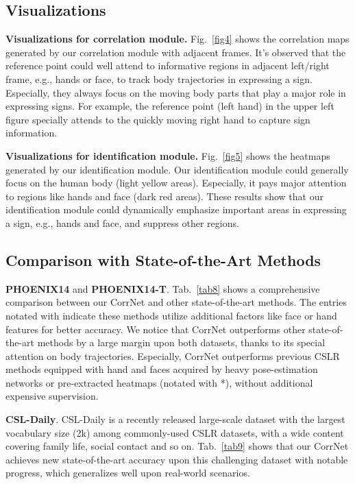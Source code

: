 \documentclass[10pt,twocolumn,letterpaper]{article}
\begin{document}
\subsection{Visualizations}
\textbf{Visualizations for correlation module.} Fig.~\ref{fig4} shows the correlation maps generated by our correlation module with adjacent frames. It's observed that the reference point could well attend to informative regions in adjacent left/right frame, e.g., hands or face, to track body trajectories in expressing a sign. Especially, they always focus on the moving body parts that play a major role in expressing signs. For example, the reference point (left hand) in the upper left figure specially attends to the quickly moving right hand to capture sign information.

\textbf{Visualizations for identification module.} Fig.~\ref{fig5} shows the heatmaps generated by our identification module. Our identification module could generally focus on the human body (light yellow areas). Especially, it pays major attention to regions like hands and face (dark red areas). These results show that our identification module could dynamically emphasize important areas in expressing a sign, e.g., hands and face, and suppress other regions. 

\subsection{Comparison with State-of-the-Art Methods}
\textbf{PHOENIX14} and \textbf{PHOENIX14-T}. Tab.~\ref{tab8} shows a comprehensive comparison between our CorrNet and other state-of-the-art methods. The entries notated with  indicate these methods utilize additional factors like face or hand features for better accuracy. We notice that CorrNet outperforms other state-of-the-art methods by a large margin upon both datasets, thanks to its special attention on body trajectories. Especially, CorrNet outperforms previous CSLR methods equipped with hand and faces acquired by heavy pose-estimation networks or pre-extracted heatmaps (notated with *), without additional expensive supervision. 

\textbf{CSL-Daily}. CSL-Daily is a recently released large-scale dataset with the largest vocabulary size (2k) among commonly-used CSLR datasets, with a wide content covering family life, social contact and so on. Tab.~\ref{tab9} shows that our CorrNet achieves new state-of-the-art accuracy upon this challenging dataset with notable progress, which generalizes well upon real-world scenarios.
\end{document}
